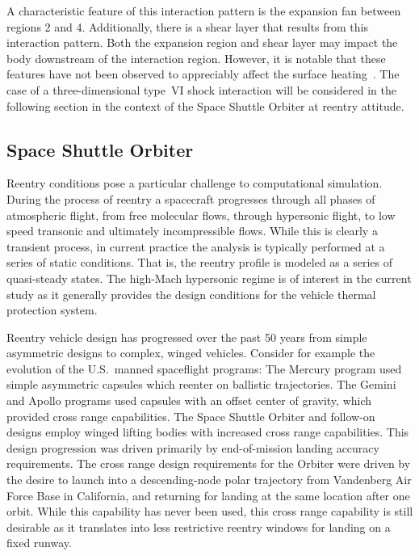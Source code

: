 A characteristic feature of this interaction pattern is the expansion fan between regions 2 and 4.  Additionally, there is a shear layer that results from this interaction pattern.  Both the expansion region and shear layer may impact the body downstream of the interaction region.  However, it is notable that these features have not been observed to appreciably affect the surface heating~\cite{edney-ssi}.  The case of a three-dimensional type~VI shock interaction will be considered in the following section in the context of the Space Shuttle Orbiter at reentry attitude.


\clearpage
\subsection{Space Shuttle Orbiter}
\enlargethispage{-\baselineskip}
Reentry conditions pose a particular challenge to computational simulation.  During the process of reentry a spacecraft progresses through all phases of atmospheric flight, from free molecular flows, through hypersonic flight, to low speed transonic and ultimately incompressible flows.  While this is clearly a transient process, in current practice the analysis is typically performed at a series of static conditions. That is, the reentry profile is modeled as a series of quasi-steady states.  The high-Mach hypersonic regime is of interest in the current study as it generally provides the design conditions for the vehicle thermal protection system.

Reentry vehicle design has progressed over the past 50 years from simple asymmetric designs to complex, winged vehicles.  Consider for example the evolution of the U.S.\ manned spaceflight programs: The Mercury program used simple asymmetric capsules which reenter on ballistic trajectories. The Gemini and Apollo programs used capsules with an offset center of gravity, which provided cross range capabilities. The Space Shuttle Orbiter and follow-on designs employ winged lifting bodies with increased cross range capabilities.  This design progression was driven primarily by end-of-mission landing accuracy requirements.  The cross range design requirements for the Orbiter were driven by the desire to launch into a descending-node polar trajectory from Vandenberg Air Force Base in California, and returning for landing at the same location after one orbit.  While this capability has never been used, this cross range capability is still desirable as it translates into less restrictive reentry windows for landing on a fixed runway.  

